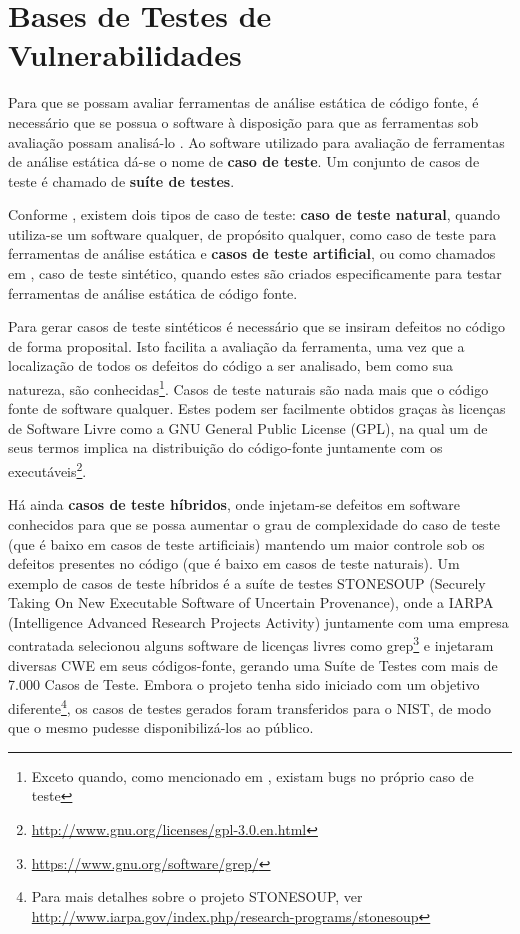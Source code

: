   \section{Bases de Testes de Vulnerabilidades}\label{fundamentacao_teorica:bases_de_testes_de_vulnerabilidades}

  Para que se possam avaliar ferramentas de análise estática de código fonte, é necessário que se possua o software à disposição para que as ferramentas sob avaliação possam analisá-lo \cite{nsa}. Ao software utilizado para avaliação de ferramentas de análise estática dá-se o nome de \textbf{caso de teste}. Um conjunto de casos de teste é chamado de \textbf{suíte de testes}.

  Conforme \cite{nsa}, existem dois tipos de caso de teste: \textbf{caso de teste natural}, quando utiliza-se um software qualquer, de propósito qualquer, como caso de teste para ferramentas de análise estática e \textbf{casos de teste artificial}, ou como chamados em \cite {juliet}, caso de teste sintético, quando estes são criados especificamente para testar ferramentas de análise estática de código fonte.

  Para gerar casos de teste sintéticos é necessário que se insiram defeitos no código de forma proposital. Isto facilita a avaliação da ferramenta, uma vez que a localização de todos os defeitos do código a ser analisado, bem como sua natureza, são conhecidas\footnote{Exceto quando, como mencionado em \cite{pascal}, existam bugs no próprio caso de teste}. Casos de teste naturais são nada mais que o código fonte de software qualquer. Estes podem ser facilmente obtidos graças às licenças de Software Livre como a GNU General Public License (GPL),  na qual um de seus termos implica na distribuição do código-fonte juntamente com os executáveis\footnote{\url{http://www.gnu.org/licenses/gpl-3.0.en.html}}.

  Há ainda \textbf{casos de teste híbridos}, onde injetam-se defeitos em software conhecidos para que se possa aumentar o grau de complexidade do caso de teste (que é baixo em casos de teste artificiais) mantendo um maior controle sob os defeitos presentes no código (que é baixo em casos de teste naturais). Um exemplo de casos de teste híbridos é a suíte de testes STONESOUP (Securely Taking On New Executable Software of Uncertain Provenance), onde a IARPA (Intelligence Advanced Research Projects Activity) juntamente com uma empresa contratada selecionou alguns software de licenças livres como grep\footnote{\url{https://www.gnu.org/software/grep/}} e injetaram diversas CWE em seus códigos-fonte, gerando uma Suíte de Testes com mais de 7.000 Casos de Teste. Embora o projeto tenha sido iniciado com um objetivo diferente\footnote{Para mais detalhes sobre o projeto STONESOUP, ver \url{http://www.iarpa.gov/index.php/research-programs/stonesoup}}, os casos de testes gerados foram transferidos para o NIST, de modo que o mesmo pudesse disponibilizá-los ao público.

